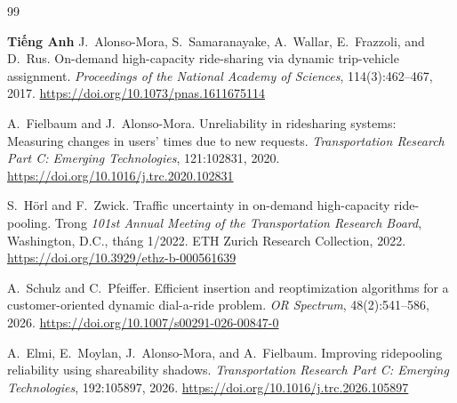 \renewcommand{\bibname}{Tài liệu tham khảo}
\begin{thebibliography}{99}
\addcontentsline{toc}{chapter}{\bibname}
\setlength{\itemsep}{2pt}

\item[]\textbf{Tiếng Anh}
J.~Alonso-Mora, S.~Samaranayake, A.~Wallar, E.~Frazzoli, and D.~Rus.
\newblock On-demand high-capacity ride-sharing via dynamic trip-vehicle assignment.
\newblock \emph{Proceedings of the National Academy of Sciences}, 114(3):462--467, 2017.
\newblock \url{https://doi.org/10.1073/pnas.1611675114}

A.~Fielbaum and J.~Alonso-Mora.
\newblock Unreliability in ridesharing systems: Measuring changes in users' times due to new requests.
\newblock \emph{Transportation Research Part C: Emerging Technologies}, 121:102831, 2020.
\newblock \url{https://doi.org/10.1016/j.trc.2020.102831}

S.~Hörl and F.~Zwick.
\newblock Traffic uncertainty in on-demand high-capacity ride-pooling.
\newblock Trong \emph{101st Annual Meeting of the Transportation Research Board}, Washington, D.C., tháng 1/2022. ETH Zurich Research Collection, 2022.
\newblock \url{https://doi.org/10.3929/ethz-b-000561639}

A.~Schulz and C.~Pfeiffer.
\newblock Efficient insertion and reoptimization algorithms for a customer-oriented dynamic dial-a-ride problem.
\newblock \emph{OR Spectrum}, 48(2):541--586, 2026.
\newblock \url{https://doi.org/10.1007/s00291-026-00847-0}

A.~Elmi, E.~Moylan, J.~Alonso-Mora, and A.~Fielbaum.
\newblock Improving ridepooling reliability using shareability shadows.
\newblock \emph{Transportation Research Part C: Emerging Technologies}, 192:105897, 2026.
\newblock \url{https://doi.org/10.1016/j.trc.2026.105897}


\end{thebibliography}
